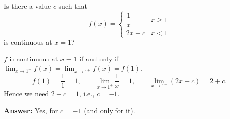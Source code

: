 
\begin{question}
Is there a value $c$ such that
\[
f(x)=\begin{cases}\dfrac1x & x\ge1\\[1ex] 2x+c & x<1\end{cases}
\]
is continuous at $x=1$?
\end{question}

\begin{solution}
$f$ is continuous at $x=1$ if and only if $\lim_{x\to1^-}f(x)=\lim_{x\to1^+}f(x)=f(1)$.
\[
f(1)=\frac11=1,\qquad \lim_{x\to1^+}\frac1x=1,\qquad \lim_{x\to1^-}(2x+c)=2+c.
\]
Hence we need $2+c=1$, i.e., $c=-1$.

\textbf{Answer:} Yes, for $c=-1$ (and only for it).
\end{solution}
